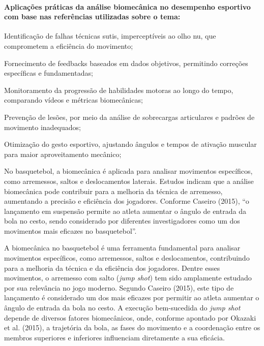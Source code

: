 \paragraph{Aplicações práticas da análise biomecânica no desempenho esportivo com base nas referências utilizadas sobre o tema:}
\begin{myitemize}
  \item Identificação de falhas técnicas sutis, imperceptíveis ao olho nu, que comprometem a eficiência do movimento;
  \item Fornecimento de feedbacks baseados em dados objetivos, permitindo correções específicas e fundamentadas;
  \item Monitoramento da progressão de habilidades motoras ao longo do tempo, comparando vídeos e métricas biomecânicas;
  \item Prevenção de lesões, por meio da análise de sobrecargas articulares e padrões de movimento inadequados;
  \item Otimização do gesto esportivo, ajustando ângulos e tempos de ativação muscular para maior aproveitamento mecânico;
\end{myitemize}


No basquetebol, a biomecânica é aplicada para analisar movimentos específicos, como arremessos, saltos e deslocamentos laterais. 
Estudos indicam que a análise biomecânica pode contribuir para a melhoria da técnica de arremesso, aumentando a precisão e eficiência dos jogadores. 
Conforme Caseiro (2015), “o lançamento em suspensão permite ao atleta aumentar o ângulo de entrada da bola no cesto, sendo considerado por diferentes investigadores como um dos movimentos mais eficazes no basquetebol”.

A biomecânica no basquetebol é uma ferramenta fundamental para analisar movimentos específicos, como arremessos, saltos e deslocamentos, contribuindo para a melhoria da técnica e da eficiência dos jogadores. 
Dentre esses movimentos, o arremesso com salto (\textit{jump shot}) tem sido amplamente estudado por sua relevância no jogo moderno. Segundo Caseiro (2015), 
este tipo de lançamento é considerado um dos mais eficazes por permitir ao atleta aumentar o ângulo de entrada da bola no cesto. A execução bem-sucedida do \textit{jump shot} depende de diversos fatores biomecânicos, onde, conforme apontado por Okazaki et al. 
(2015), a trajetória da bola, as fases do movimento e a coordenação entre os membros superiores e inferiores influenciam diretamente a sua eficácia.

